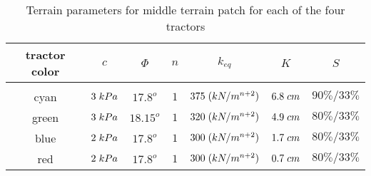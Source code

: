 \begin{table}[htbp]
\caption{Terrain parameters for middle terrain patch for each of the four tractors}
\label{table:middle_terrain_4tractors_WC}
\begin{center}
\vspace{-5mm}
\begin{tabular}{ |c|c|c|c|c|c|c| } 
 \hline
 tractor color & $c$ & $\Phi$ & $n$ & $k_{eq}$ & $K$ & $S$ \\ 
 \hline
  \vspace{-0.6mm} & \vspace{-0.6mm} & \vspace{-0.6mm} & \vspace{-0.6mm} & \vspace{-0.6mm} & \vspace{-0.6mm} & \vspace{-0.6mm}  \\ 
 \hline
 cyan & $3\hspace{1mm}kPa$ & $17.8^o$ & $1$ & $375\hspace{1mm}(kN/m^{n+2})$ & $6.8\hspace{1mm}cm$ & $ 90\%/33\%$ \\ 
 \hline
 green & $3\hspace{1mm}kPa$ & $18.15^o$ & $1$ & $320\hspace{1mm}(kN/m^{n+2})$ & $4.9\hspace{1mm}cm$ & $80\%/33\%$ \\ 
 \hline
 blue & $2\hspace{1mm}kPa$ & $17.8^o$ & $1$ & $300\hspace{1mm}(kN/m^{n+2})$ & $1.7\hspace{1mm}cm$ & $80\%/33\%$ \\ 
 \hline
 red & $2\hspace{1mm}kPa$ & $17.8^o$ & $1$ & $300\hspace{1mm}(kN/m^{n+2})$ & $0.7\hspace{1mm}cm$ & $80\%/33\%$ \\ 
 \hline
\end{tabular}
\end{center}
\end{table}
